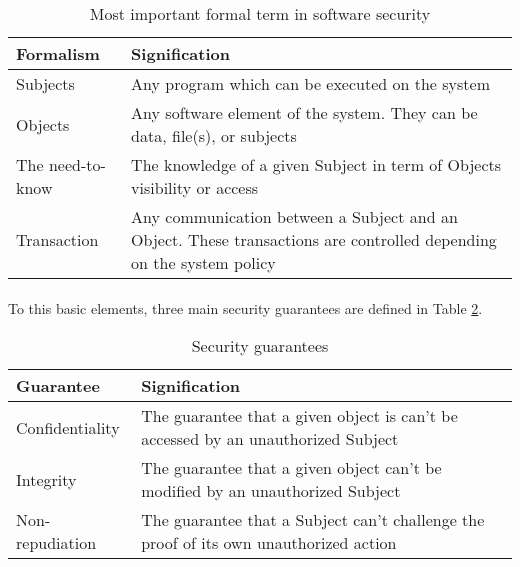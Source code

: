 \begin{table}
\begin{tabular}{|p{5cm}|p{10cm}|}
\hline
  Formalism & Signification \\
\hline
\hline
  Subjects & \begin{minipage}{10cm}Any program which can be executed on the system\end{minipage} \\
\hline
  Objects & \begin{minipage}{10cm}Any software element of the system. They can be data, file(s), or
  subjects\end{minipage} \\
\hline
  The need-to-know & \begin{minipage}{10cm}The knowledge of a given Subject in term of Objects
  visibility or access\end{minipage} \\
\hline
  Transaction & \begin{minipage}{10cm}Any communication between a Subject and an Object. These
  transactions are controlled depending on the system policy\end{minipage} \\
\hline
\end{tabular}
\caption{Most important formal term in software security\label{tab:secformalfirst}}
\end{table}

\paragraph{}
To this basic elements, three main security guarantees are defined in Table \ref{tab:secguarantee}.

\begin{table}
\begin{tabular}{|p{5cm}|p{10cm}|}
\hline
  Guarantee & Signification \\
\hline
\hline
  Confidentiality & \begin{minipage}{10cm}The guarantee that a given object is can't be accessed by
  an unauthorized Subject\end{minipage} \\
\hline
  Integrity & \begin{minipage}{10cm}The guarantee that a given object can't be modified by an
  unauthorized Subject\end{minipage} \\
\hline
  Non-repudiation & \begin{minipage}{10cm}The guarantee that a Subject can't challenge the proof of
  its own unauthorized action\end{minipage} \\
\hline
\end{tabular}
\caption{Security guarantees\label{tab:secguarantee}}
\end{table}



